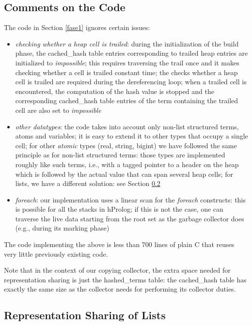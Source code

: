 \documentclass{tlp}
\begin{document}
\subsection{Comments on the Code}\label{commentscode}

The code in Section \ref{fase1} ignores certain issues:

\begin{itemize}
\item
{\em checking whether a heap cell is trailed}: during the
initialization of the build phase, the cached\_hash table entries
corresponding to trailed heap entries are initialized to {\em
  impossible}; this requires traversing the trail once and it makes
checking whether a cell is trailed constant time; the checks whether a
heap cell is trailed are required during the dereferencing loop; when
a trailed cell is encountered, the computation of the hash value is
stopped and the corresponding cached\_hash table entries of the term
containing the trailed cell are also set to {\em impossible}
\item 
{\em other datatypes}: the code takes into account only non-list
structured terms, atoms and variables; it is easy to extend it to
other types that occupy a single cell; for other {\em atomic} types
(real, string, bigint) we have followed the same principle as for
non-list structured terms: those types are implemented roughly like
such terms, i.e., with a tagged pointer to a header on the heap which
is followed by the actual value that can span several heap cells; for
lists, we have a different solution: see Section \ref{doinglists}
\item 
{\em foreach}: our implementation uses a linear scan for the {\em
  foreach} constructs: this is possible for all the stacks in hProlog;
if this is not the case, one can traverse the live data starting from
the root set as the garbage collector does (e.g., during its marking
phase)
\end{itemize}

The code implementing the above is less than 700 lines of plain C that
reuses very little previously existing code.

Note that in the context of our copying collector, the extra space
needed for representation sharing is just the hashed\_terms table: the
cached\_hash table has exactly the same size as the collector needs
for performing its collector duties.


\subsection{Representation Sharing of Lists}\label{doinglists}
\end{document}
